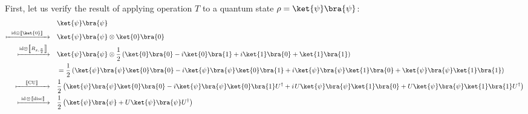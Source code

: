 First, let us verify the result  of applying operation  $T$ to a quantum state $\rho=\ket{\psi}\bra{\psi}$:
\begin{equation*} \label{eq:operation_T}
  \begin{split}
  &\ket{\psi} \bra{\psi}\\
 \xmapsto{ \hspace{6pt}\id  \otimes \sem{\ket{0}} \hspace{7pt}} \quad & \ket{\psi} \bra{\psi} \otimes \ket{0} \bra{0} \\
  \xmapsto{ \id  \otimes \sem{R_{x,\frac{\pi}{2}}}} \quad  & \ket{\psi} \bra{\psi} \otimes \frac{1}{2} \left( \ket{0}\bra{0} -i \ket{0}\bra{1} + i \ket{1}\bra{0} + \ket{1}\bra{1} \right)  \\
  & = \frac{1}{2} \left( \ket{\psi} \bra{\psi}  \ket{0}\bra{0} -i \ket{\psi} \bra{\psi}\ket{0}\bra{1} + i \ket{\psi} \bra{\psi} \ket{1}\bra{0} + \ket{\psi} \bra{\psi}  \ket{1}\bra{1} \right) \\
  \xmapsto{\hspace{13pt} \sem{\text{CU}} \hspace{14pt}} \quad & \frac{1}{2} \left( \ket{\psi} \bra{\psi} \ket{0}\bra{0} - i\ket{\psi} \bra{\psi}\ket{0}\bra{1} U^{\dag} + i \hspace{1pt} U\ket{\psi} \bra{\psi} \ket{1}\bra{0} + U \ket{\psi} \bra{\psi}  \ket{1}\bra{1}U^{\dag} \right) \\ 
  \xmapsto{ \hspace{3pt} \id \hspace{1pt}\otimes \hspace{1pt}  \sem{\text{disc}} \hspace{4pt} } \quad & \frac{1}{2} \left(\ket{\psi} \bra{\psi} + U\ket{\psi} \bra{\psi}U^{\dag} \right) \\
  \end{split} 
\end{equation*}

